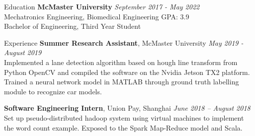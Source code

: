 \documentclass{resume} %
\begin{document}

\begin{rSection}{Education}
{\bf McMaster University} \hfill {\em September 2017 - May 2022 } 
\\ Mechatronics Engineering, Biomedical Engineering \hfill { GPA: 3.9 } 
\\ Bachelor of Engineering, Third Year Student



%
%

\end{rSection}
\begin{rSection}{Experience}
{\bf Summer Research Assistant}{, McMaster University } \hfill {\em May 2019 - August 2019}\\
Implemented a lane detection algorithm based on hough line transform from Python OpenCV and compiled the software on the Nvidia Jetson TX2 platform. Trained a neural network model in MATLAB through ground truth labelling module to recognize car models.

{\bf Software Engineering Intern}{, Union Pay, Shanghai} \hfill {\em June 2018 – August 2018}\\
Set up pseudo-distributed hadoop system using virtual machines to implement the word count example. Exposed to the Spark Map-Reduce model and Scala.

%
\end{rSection}
\end{document}
